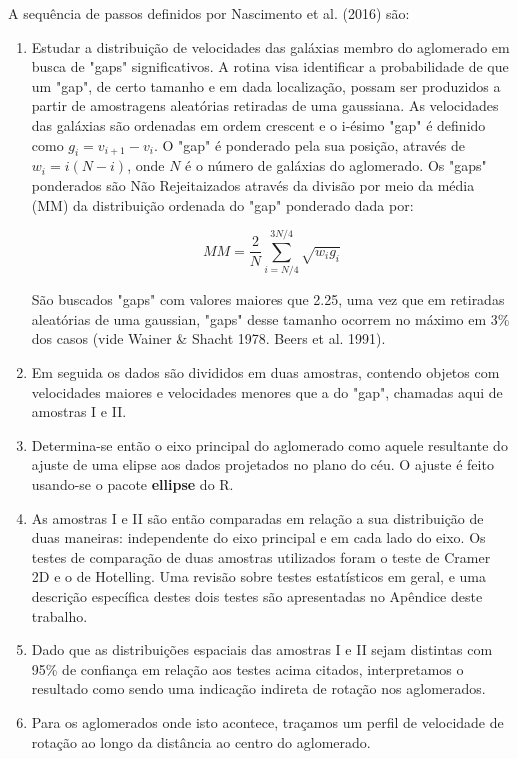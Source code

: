 \documentclass[12pt,fleqn]{article}
\begin{document}
{A sequência de passos definidos por Nascimento et al. (2016) são:

\begin{enumerate}
\item  Estudar a distribuição de velocidades das galáxias membro do aglomerado
em busca de "gaps" significativos. A rotina visa identificar a probabilidade de que um "gap", 
de certo tamanho e em dada localização, possam ser produzidos a partir de amostragens
aleatórias retiradas de uma gaussiana. As velocidades das galáxias são ordenadas em ordem
crescent e o i-ésimo "gap" é definido como $g_i = v_{i+1} - v_i$. O "gap" é ponderado
pela sua posição, através de $w_i=i(N-i)$, onde $N$ é o número de galáxias do aglomerado.
Os "gaps" ponderados são Não Rejeitaizados através da divisão por meio da média (MM) da distribuição ordenada do "gap" ponderado dada por:

$$MM = \frac{2}{N} \sum_{i=N/4}^{3N/4} \sqrt{w_i g_i}$$

São buscados "gaps" com valores maiores que 2.25, uma vez que em retiradas aleatórias de
uma gaussian, "gaps" desse tamanho ocorrem no máximo em 3\% dos casos (vide Wainer \& Shacht 1978. Beers et al. 1991).

\item Em seguida os dados são divididos em duas amostras, contendo objetos
com velocidades maiores e velocidades menores que a do "gap", chamadas aqui
de amostras I e II.

\item Determina-se então o eixo principal do aglomerado como aquele resultante
do ajuste de uma elipse aos dados projetados no plano do céu. O ajuste é feito
usando-se o pacote {\bf ellipse} do R.

\item As amostras I e II são então comparadas em relação a sua distribuição 
de duas maneiras: independente do eixo principal e em cada lado do eixo.
Os testes de comparação de duas amostras utilizados foram o teste de Cramer 2D
e o de Hotelling. Uma revisão sobre testes estatísticos em geral, e uma
descrição específica destes dois testes são apresentadas no Apêndice
deste trabalho.

\item Dado que as distribuições espaciais das amostras  I e II sejam distintas
com 95\% de confiança em relação aos testes acima citados, interpretamos o resultado
como sendo uma indicação indireta de rotação nos aglomerados.

\item Para os aglomerados onde isto acontece, traçamos um perfil de velocidade
de rotação ao  longo da distância ao centro do aglomerado.


\end{enumerate}}
\end{document}

